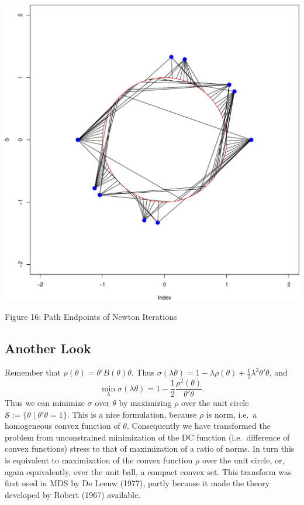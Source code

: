 \documentclass[
  12pt,
]{article}
\begin{document}
\begin{center}\includegraphics{twoPoints_files/figure-latex/path_newton-1} \end{center}

Figure 16: Path Endpoints of Newton Iterations

\subsection{Another Look}\label{another-look}

Remember that \(\rho(\theta)=\theta'B(\theta)\theta\). Thus \(\sigma(\lambda\theta)=1-\lambda\rho(\theta)+\frac12\lambda^2\theta'\theta\), and
\[
\min_\lambda\sigma(\lambda\theta)=1-\frac12\frac{\rho^2(\theta)}{\theta'\theta}.
\]
Thus we can minimize \(\sigma\) over \(\theta\) by maximizing \(\rho\) over the unit circle \(\mathcal{S}:=\{\theta\mid\theta'\theta=1\}\). This is a nice formulation, because
\(\rho\) is norm, i.e.~a homogeneous convex function of \(\theta\). Consequently we have transformed the problem from unconstrained minimization of the DC
function (i.e.~difference of convex functions) stress to that of maximization of a ratio of norms. In turn this is equivalent to maximization of the convex function \(\rho\) over the unit circle, or, again equivalently, over the unit ball, a compact convex set. This transform was first used in MDS by De Leeuw (1977), partly because it made the theory developed by Robert (1967) available.
\end{document}
